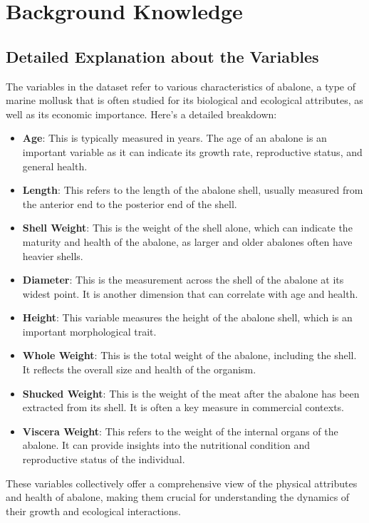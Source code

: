 \documentclass{article}
\begin{document}
\section{Background Knowledge}
\subsection{Detailed Explanation about the Variables}
The variables in the dataset refer to various characteristics of abalone, a type of marine mollusk that is often studied for its biological and ecological attributes, as well as its economic importance. Here's a detailed breakdown:

\begin{itemize}
\item \textbf{Age}: This is typically measured in years. The age of an abalone is an important variable as it can indicate its growth rate, reproductive status, and general health.
\item \textbf{Length}: This refers to the length of the abalone shell, usually measured from the anterior end to the posterior end of the shell.
\item \textbf{Shell Weight}: This is the weight of the shell alone, which can indicate the maturity and health of the abalone, as larger and older abalones often have heavier shells.
\item \textbf{Diameter}: This is the measurement across the shell of the abalone at its widest point. It is another dimension that can correlate with age and health.
\item \textbf{Height}: This variable measures the height of the abalone shell, which is an important morphological trait.
\item \textbf{Whole Weight}: This is the total weight of the abalone, including the shell. It reflects the overall size and health of the organism.
\item \textbf{Shucked Weight}: This is the weight of the meat after the abalone has been extracted from its shell. It is often a key measure in commercial contexts.
\item \textbf{Viscera Weight}: This refers to the weight of the internal organs of the abalone. It can provide insights into the nutritional condition and reproductive status of the individual. 
\end{itemize}

These variables collectively offer a comprehensive view of the physical attributes and health of abalone, making them crucial for understanding the dynamics of their growth and ecological interactions.
\end{document}
